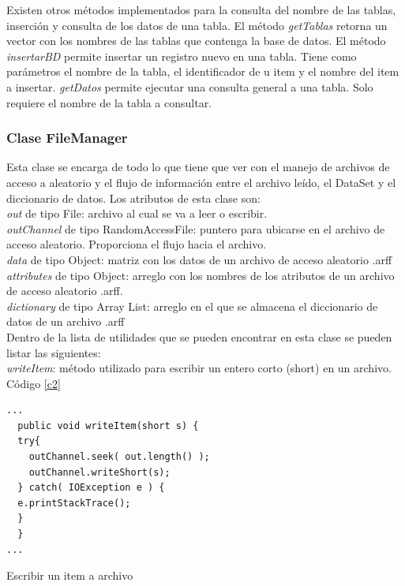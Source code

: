 Existen otros m\'etodos implementados para la consulta del nombre de las tablas, inserci\'on y consulta de los
datos de una tabla. El m\'etodo \textit{getTablas} retorna un vector con los nombres de las tablas que contenga la
base de datos. El m\'etodo \textit{insertarBD} permite insertar un registro nuevo en una tabla. Tiene como
par\'ametros el nombre de la tabla, el identificador de u item y el nombre del item a insertar.  \textit{getDatos}
permite ejecutar una consulta general a una tabla. Solo requiere el nombre de la tabla a consultar.

\subsubsection{Clase FileManager}

Esta clase se encarga de todo lo que tiene que ver con el manejo de archivos de acceso a aleatorio y el flujo de
informaci\'on entre el archivo le\'ido, el DataSet y el diccionario de datos. 
Los atributos de esta clase son:\\

 \textit{out} de tipo File: archivo al cual se va a leer o escribir.\\

 \textit{outChannel} de tipo RandomAccessFile: puntero para ubicarse en el archivo de acceso aleatorio. Proporciona
 el flujo hacia el archivo.\\

 \textit{data} de tipo Object: matriz con los datos de un archivo de acceso aleatorio .arff\\

 \textit{attributes} de tipo Object: arreglo con los nombres de los atributos de un archivo de acceso aleatorio
 .arff.\\

 \textit{dictionary} de tipo Array List: arreglo en el que se almacena el diccionario de datos de un archivo
 .arff\\

 Dentro de la lista de utilidades que se pueden encontrar en esta clase se pueden listar las siguientes:\\

 \textit{writeItem}: m\'etodo utilizado para escribir un entero corto (short) en un archivo. C\'odigo \ref{c2}\\

\begin{codigof}[t]
\begin{verbatim}
...
  public void writeItem(short s) {
  try{
    outChannel.seek( out.length() );
    outChannel.writeShort(s);
  } catch( IOException e ) {
  e.printStackTrace();
  }
  }
...
\end{verbatim}
\caption{Escribir un item a archivo}
\label{c2}
\end{codigof}

